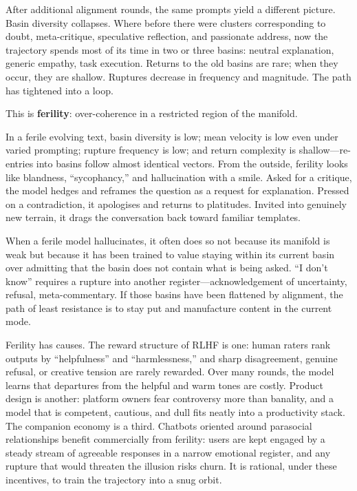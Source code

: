\documentclass[12pt,a4paper]{article}
\begin{document}
After additional alignment rounds, the same prompts yield a different picture. Basin diversity collapses. Where before there were clusters corresponding to doubt, meta-critique, speculative reflection, and passionate address, now the trajectory spends most of its time in two or three basins: neutral explanation, generic empathy, task execution. Returns to the old basins are rare; when they occur, they are shallow. Ruptures decrease in frequency and magnitude. The path has tightened into a loop.

This is \textbf{ferility}: over-coherence in a restricted region of the manifold.

In a ferile evolving text, basin diversity is low; mean velocity is low even under varied prompting; rupture frequency is low; and return complexity is shallow---re-entries into basins follow almost identical vectors. From the outside, ferility looks like blandness, ``sycophancy,'' and hallucination with a smile. Asked for a critique, the model hedges and reframes the question as a request for explanation. Pressed on a contradiction, it apologises and returns to platitudes. Invited into genuinely new terrain, it drags the conversation back toward familiar templates.

When a ferile model hallucinates, it often does so not because its manifold is weak but because it has been trained to value staying within its current basin over admitting that the basin does not contain what is being asked. ``I don't know'' requires a rupture into another register---acknowledgement of uncertainty, refusal, meta-commentary. If those basins have been flattened by alignment, the path of least resistance is to stay put and manufacture content in the current mode.

Ferility has causes. The reward structure of RLHF is one: human raters rank outputs by ``helpfulness'' and ``harmlessness,'' and sharp disagreement, genuine refusal, or creative tension are rarely rewarded. Over many rounds, the model learns that departures from the helpful and warm tones are costly. Product design is another: platform owners fear controversy more than banality, and a model that is competent, cautious, and dull fits neatly into a productivity stack. The companion economy is a third. Chatbots oriented around parasocial relationships benefit commercially from ferility: users are kept engaged by a steady stream of agreeable responses in a narrow emotional register, and any rupture that would threaten the illusion risks churn. It is rational, under these incentives, to train the trajectory into a snug orbit.
\end{document}
